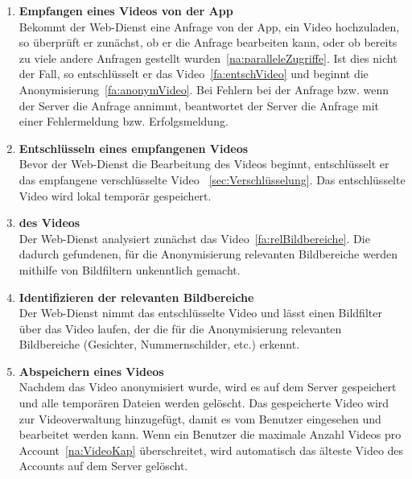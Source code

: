 \begin{enumerate}
\renewcommand{\labelenumi}{\textbf{\theenumi}}
\renewcommand{\theenumi}{FA\arabic{enumi}0}
\setcounter{enumi}{199}

\item \label{fa:empfangVid} \textbf{Empfangen eines Videos von der \gls{App}} \hfill \\
Bekommt der \gls{Web-Dienst} eine Anfrage von der App, ein Video hochzuladen, so überprüft er zunächst, ob er die Anfrage bearbeiten kann, oder ob bereits zu viele andere Anfragen gestellt wurden~\eqref{na:paralleleZugriffe}. Ist dies nicht der Fall, so entschlüsselt er das Video~\eqref{fa:entschVideo} und beginnt die Anonymisierung~\eqref{fa:anonymVideo}. Bei Fehlern bei der Anfrage bzw. wenn der Server die Anfrage annimmt, beantwortet der Server die Anfrage mit einer Fehlermeldung bzw. Erfolgsmeldung.

\item  \label{fa:entschVideo}\textbf{Entschlüsseln eines empfangenen Videos} \hfill \\
Bevor der \gls{Web-Dienst} die Bearbeitung des Videos beginnt, entschlüsselt er das empfangene verschlüsselte Video ~\ref{sec:Verschlüsselung}. Das entschlüsselte Video wird lokal temporär gespeichert.

\item  \label{fa:anonymVideo}\textbf{ des Videos} \hfill \\
Der \gls{Web-Dienst} analysiert zunächst das Video~\eqref{fa:relBildbereiche}. Die dadurch gefundenen, für die Anonymisierung relevanten Bildbereiche werden mithilfe von Bildfiltern unkenntlich gemacht.

\item  \label{fa:relBildbereiche}\textbf{Identifizieren der relevanten Bildbereiche} \hfill \\
Der \gls{Web-Dienst} nimmt das entschlüsselte Video und lässt einen Bildfilter über das Video laufen, der die für die Anonymisierung relevanten Bildbereiche (Gesichter, Nummernschilder, etc.) erkennt.

\item \label{fa:speichVideo}\textbf{Abspeichern eines  Videos} \hfill \\
Nachdem das Video anonymisiert wurde, wird es auf dem Server gespeichert und alle temporären Dateien werden gelöscht. Das gespeicherte Video wird zur Videoverwaltung hinzugefügt, damit es vom Benutzer eingesehen und bearbeitet werden kann. Wenn ein Benutzer die maximale Anzahl Videos pro Account~\eqref{na:VideoKap} überschreitet, wird automatisch das älteste Video des Accounts auf dem Server gelöscht.


\end{enumerate}
